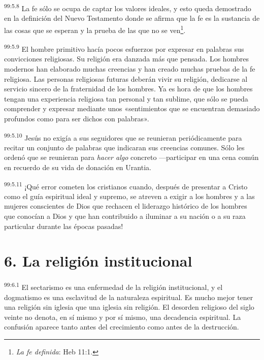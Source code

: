 \par
\textsuperscript{99:5.8} La fe sólo se ocupa de captar los valores ideales, y esto queda demostrado en la definición del Nuevo Testamento donde se afirma que la fe es la sustancia de las cosas que se esperan y la prueba de las que no se ven\footnote{\textit{La fe definida}: Heb 11:1.}.

\par
\textsuperscript{99:5.9} El hombre primitivo hacía pocos esfuerzos por expresar en palabras sus convicciones religiosas. Su religión era danzada más que pensada. Los hombres modernos han elaborado muchas creencias y han creado muchas pruebas de la fe religiosa. Las personas religiosas futuras deberán vivir su religión, dedicarse al servicio sincero de la fraternidad de los hombres. Ya es hora de que los hombres tengan una experiencia religiosa tan personal y tan sublime, que sólo se pueda comprender y expresar mediante unos «sentimientos que se encuentran demasiado profundos como para ser dichos con palabras».

\par
\textsuperscript{99:5.10} Jesús no exigía a sus seguidores que se reunieran periódicamente para recitar un conjunto de palabras que indicaran sus creencias comunes. Sólo les ordenó que se reunieran para \textit{hacer algo} concreto ---participar en una cena común en recuerdo de su vida de donación en Urantia.

\par
\textsuperscript{99:5.11} ¡Qué error cometen los cristianos cuando, después de presentar a Cristo como el guía espiritual ideal y supremo, se atreven a exigir a los hombres y a las mujeres conscientes de Dios que rechacen el liderazgo histórico de los hombres que conocían a Dios y que han contribuido a iluminar a su nación o a su raza particular durante las épocas pasadas!

\section*{6. La religión institucional}
\par
\textsuperscript{99:6.1} El sectarismo es una enfermedad de la religión institucional, y el dogmatismo es una esclavitud de la naturaleza espiritual. Es mucho mejor tener una religión sin iglesia que una iglesia sin religión. El desorden religioso del siglo veinte no denota, en sí mismo y por sí mismo, una decadencia espiritual. La confusión aparece tanto antes del crecimiento como antes de la destrucción.

